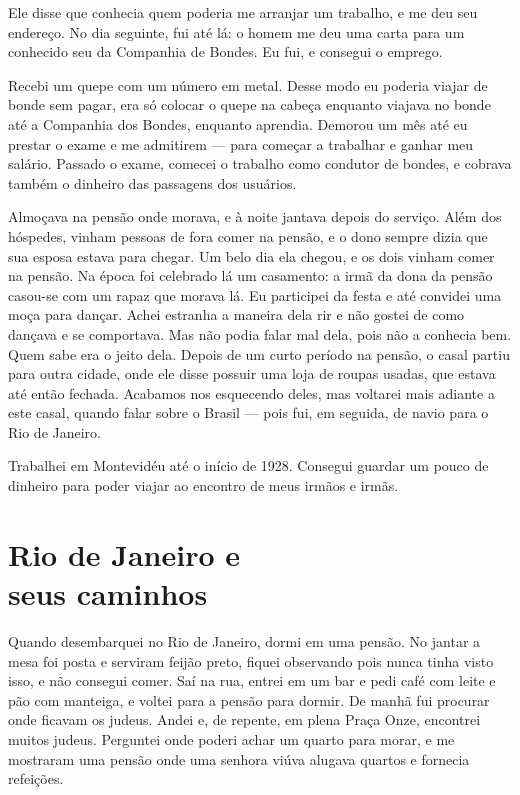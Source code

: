 Ele disse que conhecia quem poderia me arranjar um trabalho, e me deu seu
endereço. No dia seguinte, fui até lá: o homem me deu uma carta para um
conhecido seu da Companhia de Bondes. Eu fui, e consegui o emprego.

Recebi um quepe com um número em metal. Desse modo eu poderia viajar de
bonde sem pagar, era só colocar o quepe na cabeça enquanto viajava no
bonde até a Companhia dos Bondes, enquanto aprendia. Demorou um mês 
até eu prestar o exame e me admitirem --- para começar a trabalhar e ganhar 
meu salário. Passado o exame, comecei o trabalho 
como condutor de bondes, e cobrava também o dinheiro das passagens dos usuários.

Almoçava na pensão onde morava, e à noite jantava depois do serviço. Além dos hóspedes, 
vinham pessoas de fora comer na pensão, e o dono sempre
dizia que sua esposa estava para chegar. Um belo dia ela chegou, e os
dois vinham comer na pensão. Na época foi celebrado lá um casamento: a irmã
da dona da pensão casou-se com um rapaz que morava lá. Eu participei da
festa e até convidei uma moça para dançar. Achei estranha a maneira dela 
rir e não gostei de como dançava e se comportava. Mas não podia
falar mal dela, pois não a conhecia bem. Quem sabe era o jeito dela.
Depois de um curto período na pensão, o casal partiu para outra cidade,
onde ele disse possuir uma loja de roupas usadas, que estava até então 
fechada. Acabamos nos esquecendo deles, mas voltarei mais adiante a este
casal, quando falar sobre o Brasil --- pois fui, em seguida, de navio para o
Rio de Janeiro.

Trabalhei em Montevidéu até o início de 1928. Consegui guardar um pouco
de dinheiro para poder viajar ao encontro de meus irmãos e irmãs.

\chapter*{Rio de Janeiro e\\seus caminhos}

Quando desembarquei no Rio de Janeiro, dormi em uma pensão. No
jantar a mesa foi posta e serviram feijão preto, fiquei observando
pois nunca tinha visto isso, e não consegui comer. Saí na rua, entrei
em um bar e pedi café com leite e pão com manteiga, e voltei para a
pensão para dormir. De manhã fui procurar onde ficavam os judeus. Andei
e, de repente, em plena Praça Onze, encontrei muitos judeus.
Perguntei onde poderi achar um quarto para morar, e me
mostraram uma pensão onde uma senhora viúva alugava quartos e fornecia
refeições.

